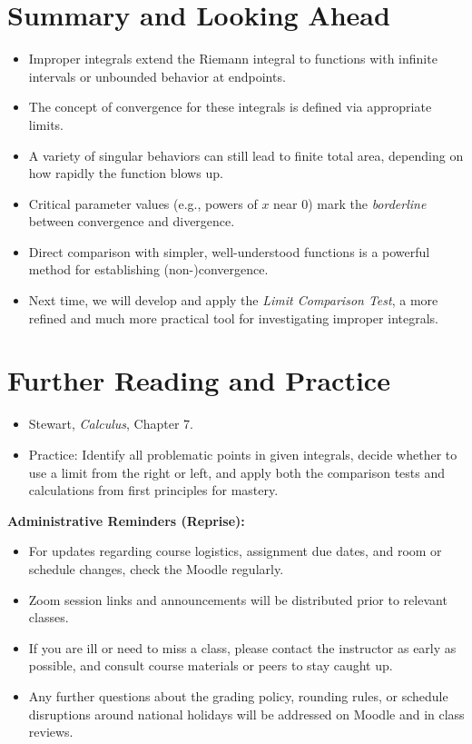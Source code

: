 \documentclass[12pt]{article}
\newenvironment{administrative_note}
  {\begin{leftbar}\color{AdminBlue}\small\ignorespaces}
  {\end{leftbar}\ignorespacesafterend}
\begin{document}
\section{Summary and Looking Ahead}

\begin{itemize}
    \item Improper integrals extend the Riemann integral to functions with infinite intervals or unbounded behavior at endpoints.
    \item The concept of convergence for these integrals is defined via appropriate limits.
    \item A variety of singular behaviors can still lead to finite total area, depending on how rapidly the function blows up.
    \item Critical parameter values (e.g., powers of $x$ near $0$) mark the \emph{borderline} between convergence and divergence.
    \item Direct comparison with simpler, well-understood functions is a powerful method for establishing (non-)convergence.
    \item Next time, we will develop and apply the \emph{Limit Comparison Test}, a more refined and much more practical tool for investigating improper integrals.
\end{itemize}

\section*{Further Reading and Practice}
\begin{itemize}
    \item Stewart, \textit{Calculus}, Chapter 7.
    \item Practice: Identify all problematic points in given integrals, decide whether to use a limit from the right or left, and apply both the comparison tests and calculations from first principles for mastery.
\end{itemize}

\vspace{2em}
\begin{administrative_note}
\textbf{Administrative Reminders (Reprise):}
\begin{itemize}
    \item For updates regarding course logistics, assignment due dates, and room or schedule changes, check the Moodle regularly.
    \item Zoom session links and announcements will be distributed prior to relevant classes.
    \item If you are ill or need to miss a class, please contact the instructor as early as possible, and consult course materials or peers to stay caught up.
    \item Any further questions about the grading policy, rounding rules, or schedule disruptions around national holidays will be addressed on Moodle and in class reviews.
\end{itemize}
\end{administrative_note}
\end{document}
